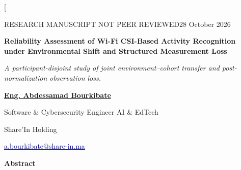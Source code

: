 \documentclass[a4paper,11pt,fleqn]{mira-author}
\begin{document}
\pagestyle{authorpages}
\color{ink}
\twocolumn[{
\begin{minipage}{\textwidth}
{\sffamily\fontsize{8}{10}\selectfont\color{muted}RESEARCH MANUSCRIPT \textbullet{} NOT PEER REVIEWED\hfill 28 October 2026\par}
\vspace{3mm}
{\fontsize{18}{21}\selectfont\bfseries\centering Reliability Assessment of Wi-Fi CSI-Based Activity Recognition\\under Environmental Shift and Structured Measurement Loss\par}
\vspace{2mm}
{\fontsize{10.5}{13}\selectfont\itshape\centering A participant-disjoint study of joint environment--cohort transfer and post-normalization observation loss.\par}
\vspace{4mm}
\begingroup\centering
{\fontsize{14}{16}\selectfont\bfseries\href{https://orcid.org/0009-0000-6186-8071}{Eng. Abdessamad Bourkibate}\par}
\vspace{1mm}
{\fontsize{13}{15}\selectfont
\href{https://orcid.org/0009-0000-6186-8071}{\textcolor{orcidgreen}{\aiOrcid}}\hspace{5mm}
\href{https://github.com/ABDESSAMAD-BOURKIBATE}{\textcolor{navy}{\faGithub}}\hspace{5mm}
\href{https://www.linkedin.com/in/abdessamad-bourkibate-b17717350/}{\textcolor{linkedinblue}{\faLinkedin}}\hspace{5mm}
\href{https://www.researchgate.net/profile/Abdessamad-Bourkibate-2}{\textcolor{researchteal}{\aiResearchGate}}\par}
\vspace{1.5mm}
{\fontsize{10.5}{13}\selectfont Software \& Cybersecurity Engineer \textbar{} AI \& EdTech\par}
{\fontsize{10.5}{13}\selectfont Share'In Holding\par}
\vspace{1mm}
{\sffamily\fontsize{9.2}{11.5}\selectfont
\href{mailto:a.bourkibate@share-in.ma}{\textcolor{navy}{\faEnvelope\;a.bourkibate@share-in.ma}}\par}
\endgroup
\vspace{4mm}
{\fontsize{11}{13}\selectfont\bfseries Abstract\par}
\vspace{1mm}
{\fontsize{10}{12.3}\selectfont
}
\end{minipage}}
\end{document}
